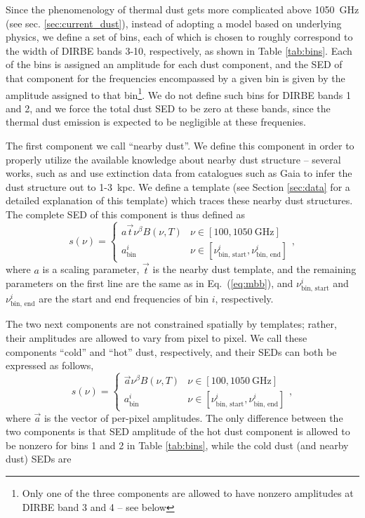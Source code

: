 \documentclass{aa}
\renewcommand{\a}[0]{\vec{a}}
\renewcommand{\t}[0]{\vec{t}}
\begin{document}
Since the phenomenology of thermal dust gets more complicated above 1050~GHz
(see sec. \ref{sec:current_dust}), instead of adopting a model based on
underlying physics, we define a set of bins, each of which is chosen to roughly
correspond to the width of DIRBE bands 3-10, respectively, as shown in Table
\ref{tab:bins}. Each of the bins is assigned an amplitude for each dust
component, and the SED of that component for the frequencies encompassed by a
given bin is given by the amplitude assigned to that bin\footnote{Only one of
    the three components are allowed to have nonzero amplitudes at DIRBE band 3
and 4 -- see below}. We do not define such bins for DIRBE bands 1 and 2, and we
force the total dust SED to be zero at these bands, since the thermal dust
emission is expected to be negligible at these frequenies.

The first component we call ``nearby dust''. We define this component in order
to properly utilize the available knowledge about nearby dust structure --
several works, such as \citet{Dharmawardena:2024} and \citet{edenhofer:2024}
use extinction data from catalogues such as Gaia to infer the dust structure
out to 1-3~kpc. We define a template (see Section \ref{sec:data} for a detailed
explanation of this template) which traces these nearby dust structures. The
complete SED of this component is thus defined as
\begin{equation}
    \label{eq:nearby_dust}
    s(\nu) = \begin{cases} a\t\nu^{\beta} B(\nu, T) & \nu \in [100,
        1050~\text{GHz}] \\
        a^i_{\textrm{bin}} & \nu \in [\nu_{\textrm{bin, start}}^i,
        \nu_{\textrm{bin, end}}^i]
            \end{cases},
\end{equation}
where $a$ is a scaling parameter, $\t$ is the nearby dust template, and the
remaining parameters on the first line are the same as in Eq.~(\ref{eq:mbb}),
and $\nu_{\textrm{bin, start}}^i$ and $\nu_{\textrm{bin, end}}^i$ are the start
and end frequencies of bin $i$, respectively.

The two next components are not constrained spatially by templates; rather,
their amplitudes are allowed to vary from pixel to pixel. We call these
components ``cold'' and ``hot'' dust, respectively, and their SEDs can both be
expressed as follows,
\begin{equation}
    \label{eq:coldhotdust}
    s(\nu) = \begin{cases} \a\nu^{\beta} B(\nu, T) & \nu \in [100,
        1050~\text{GHz}] \\
        a^i_{\textrm{bin}} & \nu \in [\nu_{\textrm{bin, start}}^i,
        \nu_{\textrm{bin, end}}^i]
            \end{cases},
\end{equation}
where $\a$ is the vector of per-pixel amplitudes. The only difference between
the two components is that SED amplitude of the hot dust component is allowed
to be nonzero for bins 1 and 2 in Table \ref{tab:bins}, while the cold dust
(and nearby dust) SEDs are
\end{document}
